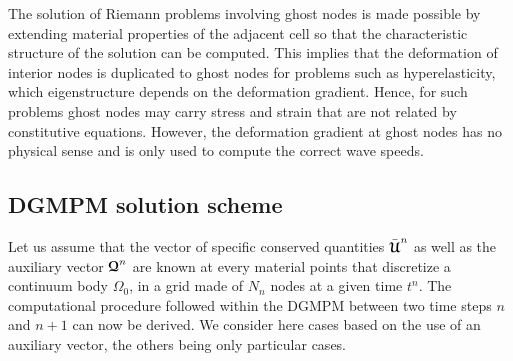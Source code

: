 \begin{remark}
  \label{rq:BC_ghostnode}
  The solution of Riemann problems involving ghost nodes is made possible by extending material properties of the adjacent cell so that the characteristic structure of the solution can be computed. This implies that the deformation of interior nodes is duplicated to ghost nodes for problems such as hyperelasticity, which eigenstructure depends on the deformation gradient. Hence, for such problems ghost nodes may carry stress and strain that are not related by constitutive equations. However, the deformation gradient at ghost nodes has no physical sense and is only used to compute the correct wave speeds.
\end{remark}

\subsection{DGMPM solution scheme}
Let us assume that the vector of specific conserved quantities $\bar{{\boldsymbol{\mathcal{U}}}}^n$ as well as the auxiliary vector ${\boldsymbol{\mathcal{Q}}}^n$ are known at every material points that discretize a continuum body $\Omega_0$, in a grid made of $N_{n}$ nodes at a given time $t^n$. The computational procedure followed within the DGMPM between two time steps $n$ and $n+1$ can now be derived. We consider here cases based on the use of an auxiliary vector, the others being only particular cases.

